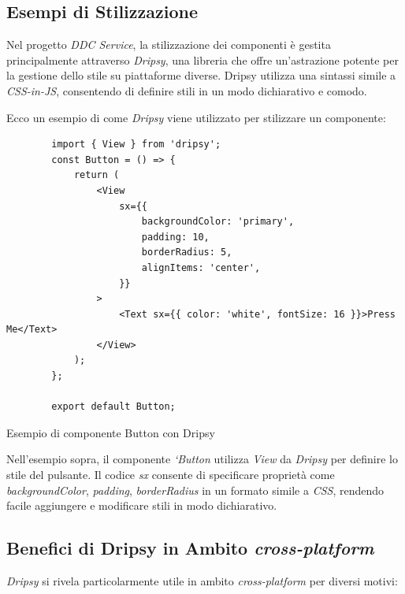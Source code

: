 \subsection{Esempi di Stilizzazione}

Nel progetto \textit{DDC Service}, la stilizzazione dei componenti è gestita principalmente attraverso \textit{Dripsy},
 una libreria che offre un'astrazione potente per la gestione dello stile su piattaforme diverse.
 Dripsy utilizza una sintassi simile a \textit{CSS-in-JS}, consentendo di definire stili in un modo dichiarativo e comodo.

Ecco un esempio di come \textit{Dripsy} viene utilizzato per stilizzare un componente:

\begin{listing}[H]
    \begin{verbatim}
        import { View } from 'dripsy';
        const Button = () => {
            return (
                <View
                    sx={{
                        backgroundColor: 'primary',
                        padding: 10,
                        borderRadius: 5,
                        alignItems: 'center',
                    }}
                >
                    <Text sx={{ color: 'white', fontSize: 16 }}>Press Me</Text>
                </View>
            );
        };

        export default Button;
    \end{verbatim}
    \caption{Esempio di componente Button con Dripsy}
    \label{listing:dripsy_button}
\end{listing}

Nell'esempio sopra, il componente \textit{`Button} utilizza \textit{View} da \textit{Dripsy} per definire lo stile del pulsante. 
Il codice \textit{sx} consente di specificare proprietà come \textit{backgroundColor}, \textit{padding}, \textit{borderRadius} in un formato simile a \textit{CSS}, 
rendendo facile aggiungere e modificare stili in modo dichiarativo.

\subsection{Benefici di Dripsy in Ambito \textit{cross-platform}}

\textit{Dripsy} si rivela particolarmente utile in ambito \textit{cross-platform} per diversi motivi:

